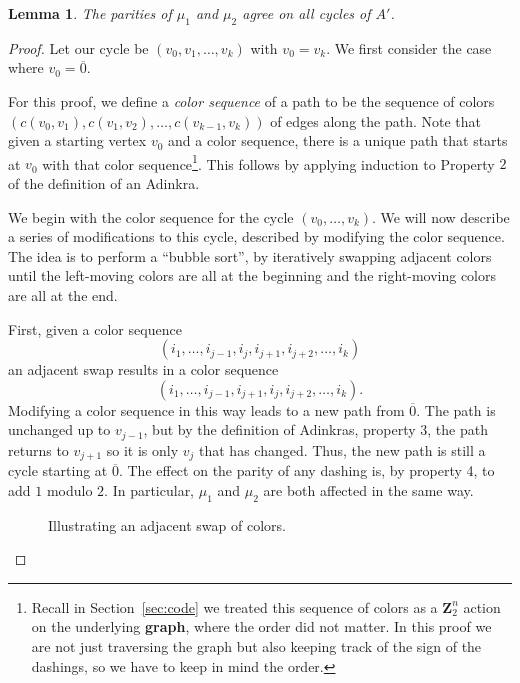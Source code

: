 \documentclass[12pt,twoside,singlespace]{article}
\numberwithin{equation}{section}
\newtheorem{lem}[equation]{Lemma}
\theoremstyle{definition}
\newcommand{\ZZ}{\mathbf{Z}}
\begin{document}
\begin{lem}
\label{lem:switch12}
The parities of $\mu_1$ and $\mu_2$ agree on all cycles of $A'$.
\end{lem}
\begin{proof}
Let our cycle be $(v_0,v_1,\ldots,v_k)$ with $v_0=v_k$.  We first consider the case where $v_0=\overline{0}$.

For this proof, we define a \emph{color sequence} of a path to be the sequence of colors $(c(v_0,v_1),c(v_1,v_2),\ldots,c(v_{k-1},v_k))$ of edges along the path.  Note that given a starting vertex $v_0$ and a color sequence, there is a unique path that starts at $v_0$ with that color sequence\footnote{Recall in Section~\ref{sec:code} we treated this sequence of colors as a $\ZZ_2^n$ action on the underlying \textbf{graph}, where the order did not matter. In this proof we are not just traversing the graph but also keeping track of the sign of the dashings, so we have to keep in mind the order.}.  This follows by applying induction to Property $2$ of the definition of an Adinkra. 

We begin with the color sequence for the cycle $(v_0,\ldots,v_k)$.  We will now describe a series of modifications to this cycle, described by modifying the color sequence.  The idea is to perform a ``bubble sort'', by iteratively swapping adjacent colors until the left-moving colors are all at the beginning and the right-moving colors are all at the end.

First, given a color sequence
\[(i_1,\ldots,i_{j-1},i_j,i_{j+1},i_{j+2},\ldots,i_k)\]
an adjacent swap results in a color sequence
\[(i_1,\ldots,i_{j-1},i_{j+1},i_j,i_{j+2},\ldots,i_k).\]
Modifying a color sequence in this way leads to a new path from $\overline{0}$.  The path is unchanged up to $v_{j-1}$, but by the definition of Adinkras, property 3, the path returns to $v_{j+1}$ so it is only $v_j$ that has changed.  Thus, the new path is still a cycle starting at $\overline{0}$.  The effect on the parity of any dashing is, by property 4, to add $1$ modulo $2$.  In particular, $\mu_1$ and $\mu_2$ are both affected in the same way.

\begin{figure}
\begin{center}
\end{center}
\caption{Illustrating an adjacent swap of colors.}
\end{figure}


\end{proof}
\end{document}
